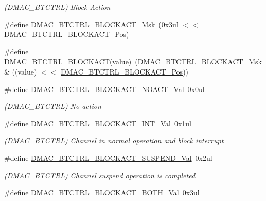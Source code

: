 \begin{DoxyCompactItemize}
\begin{DoxyCompactList}\small\item\em (D\+M\+A\+C\+\_\+\+B\+T\+C\+T\+RL) Block Action \end{DoxyCompactList}\item 
\#define \mbox{\hyperlink{group___s_a_m_d21___d_m_a_c_ga60c25bf86f42cb952c6a6fa578bd3928}{D\+M\+A\+C\+\_\+\+B\+T\+C\+T\+R\+L\+\_\+\+B\+L\+O\+C\+K\+A\+C\+T\+\_\+\+Msk}}~(0x3ul $<$$<$ D\+M\+A\+C\+\_\+\+B\+T\+C\+T\+R\+L\+\_\+\+B\+L\+O\+C\+K\+A\+C\+T\+\_\+\+Pos)
\item 
\#define \mbox{\hyperlink{group___s_a_m_d21___d_m_a_c_ga6db2acd6a57e8bf28ba1202f830d2586}{D\+M\+A\+C\+\_\+\+B\+T\+C\+T\+R\+L\+\_\+\+B\+L\+O\+C\+K\+A\+CT}}(value)~(\mbox{\hyperlink{group___s_a_m_d21___d_m_a_c_ga60c25bf86f42cb952c6a6fa578bd3928}{D\+M\+A\+C\+\_\+\+B\+T\+C\+T\+R\+L\+\_\+\+B\+L\+O\+C\+K\+A\+C\+T\+\_\+\+Msk}} \& ((value) $<$$<$ \mbox{\hyperlink{group___s_a_m_d21___d_m_a_c_ga65ebce978928207ff9f7ae48e8a1c602}{D\+M\+A\+C\+\_\+\+B\+T\+C\+T\+R\+L\+\_\+\+B\+L\+O\+C\+K\+A\+C\+T\+\_\+\+Pos}}))
\item 
\#define \mbox{\hyperlink{group___s_a_m_d21___d_m_a_c_gae3898b14fd517579b8b018b2ba176c4d}{D\+M\+A\+C\+\_\+\+B\+T\+C\+T\+R\+L\+\_\+\+B\+L\+O\+C\+K\+A\+C\+T\+\_\+\+N\+O\+A\+C\+T\+\_\+\+Val}}~0x0ul
\begin{DoxyCompactList}\small\item\em (D\+M\+A\+C\+\_\+\+B\+T\+C\+T\+RL) No action \end{DoxyCompactList}\item 
\#define \mbox{\hyperlink{group___s_a_m_d21___d_m_a_c_ga8605dcd06a16a3950e7181cd5a231bfc}{D\+M\+A\+C\+\_\+\+B\+T\+C\+T\+R\+L\+\_\+\+B\+L\+O\+C\+K\+A\+C\+T\+\_\+\+I\+N\+T\+\_\+\+Val}}~0x1ul
\begin{DoxyCompactList}\small\item\em (D\+M\+A\+C\+\_\+\+B\+T\+C\+T\+RL) Channel in normal operation and block interrupt \end{DoxyCompactList}\item 
\#define \mbox{\hyperlink{group___s_a_m_d21___d_m_a_c_ga6a02db6a41d6c6df8b95fae49b817100}{D\+M\+A\+C\+\_\+\+B\+T\+C\+T\+R\+L\+\_\+\+B\+L\+O\+C\+K\+A\+C\+T\+\_\+\+S\+U\+S\+P\+E\+N\+D\+\_\+\+Val}}~0x2ul
\begin{DoxyCompactList}\small\item\em (D\+M\+A\+C\+\_\+\+B\+T\+C\+T\+RL) Channel suspend operation is completed \end{DoxyCompactList}\item 
\#define \mbox{\hyperlink{group___s_a_m_d21___d_m_a_c_gaff1916c577aec155dc2978b341daace2}{D\+M\+A\+C\+\_\+\+B\+T\+C\+T\+R\+L\+\_\+\+B\+L\+O\+C\+K\+A\+C\+T\+\_\+\+B\+O\+T\+H\+\_\+\+Val}}~0x3ul

\end{DoxyCompactItemize}
